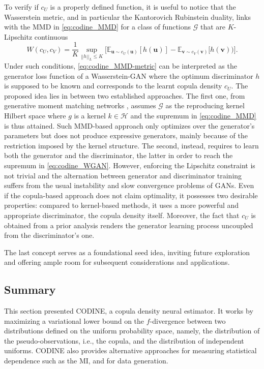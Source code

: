 To verify if $c_U$ is a properly defined function, it is useful to notice that the Wasserstein metric, and in particular the Kantorovich Rubinstein duality, links with the MMD in \eqref{eq:codine_MMD} for a class of functions $\mathcal{G}$ that are $K$-Lipschitz continuous
\begin{equation}
\label{eq:codine_WGAN}
W(c_U,c_V) = \frac{1}{K}\sup_{||h||_L\leq K}\biggl[ \mathbb{E}_{\mathbf{u}\sim c_U(\mathbf{u})}[h(\mathbf{u})]-\mathbb{E}_{\mathbf{v}\sim c_V(\mathbf{v})}[h(\mathbf{v}))\biggr].
\end{equation}
Under such conditions, \eqref{eq:codine_MMD-metric} can be interpreted as the generator loss function of a Wasserstein-GAN \cite{WGAN} where the optimum discriminator $h$ is supposed to be known and corresponds to the learnt copula density $c_U$. The proposed idea lies in between two established approaches. The first one, from generative moment matching networks \cite{GMMs}, assumes $\mathcal{G}$ as the reproducing kernel Hilbert space where $g$ is a kernel $k \in \mathcal{H}$ and the supremum in \eqref{eq:codine_MMD} is thus attained. Such MMD-based approach only optimizes over the generator's parameters but does not produce expressive generators, mainly because of the restriction imposed by the kernel structure. The second, instead, requires to learn both the generator and the discriminator, the latter in order to reach the supremum in \eqref{eq:codine_WGAN}. However, enforcing the Lipschitz constraint is not trivial and the alternation between generator and discriminator training suffers from the usual instability and slow convergence problems of GANs. Even if the copula-based approach does not claim optimality, it possesses two desirable properties: compared to kernel-based methods, it uses a more powerful and appropriate discriminator, the copula density itself. Moreover, the fact that $c_U$ is obtained from a prior analysis renders the generator learning process uncoupled from the discriminator's one.

The last concept serves as a foundational seed idea, inviting future exploration and offering ample room for subsequent considerations and applications.

\subsection{Summary}
\label{subsec:codine_conclusions}
This section presented CODINE, a copula density neural estimator. It works by maximizing a variational lower bound on the $f$-divergence between two distributions defined on the uniform probability space, namely, the distribution of the pseudo-observations, i.e., the copula, and the distribution of independent uniforms. CODINE also provides alternative approaches for measuring statistical dependence such as the MI, and for data generation.